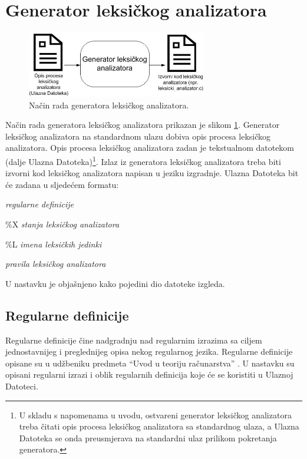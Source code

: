 \documentclass[times, 12pt, utf8]{book}
\begin{document}
\section{Generator leksičkog analizatora}

\begin{figure}[htb!]
\centering
\includegraphics[width=0.7\textwidth]{slike/generator-leksickog-analizatora.jpg}
\caption{Način rada generatora leksičkog analizatora.}
\label{fig:generator-leksickog-analizatora}
\end{figure}

Način rada generatora leksičkog analizatora prikazan je slikom \ref{fig:generator-leksickog-analizatora}.
Generator leksičkog analizatora na standardnom ulazu dobiva opis procesa leksičkog analizatora.
Opis procesa leksičkog analizatora zadan je tekstualnom datotekom (dalje Ulazna Datoteka)\footnote{U skladu s napomenama u uvodu, ostvareni generator leksičkog analizatora treba čitati opis procesa leksičkog analizatora sa standardnog ulaza, a Ulazna Datoteka se onda preusmjerava na standardni ulaz prilikom pokretanja generatora.}.
Izlaz iz generatora leksičkog analizatora treba biti izvorni kod leksičkog analizatora napisan u jeziku izgradnje.
Ulazna Datoteka bit će zadana u sljedećem formatu:
\begin{description}
\itemsep 1pt
\item \emph{regularne definicije}
\item \%X \emph{stanja leksičkog analizatora}
\item \%L \emph{imena leksičkih jedinki}
\item \emph{pravila leksičkog analizatora}
\end{description}
U nastavku je objašnjeno kako pojedini dio datoteke izgleda.

\subsection{Regularne definicije}
Regularne definicije čine nadgradnju nad regularnim izrazima sa ciljem jednostavnijeg i preglednijeg opisa nekog regularnog jezika.
Regularne definicije opisane su u udžbeniku predmeta “Uvod u teoriju računarstva” \cite[poglavlje 2.3.2]{utr}.
U nastavku su opisani regularni izrazi i oblik regularnih definicija koje će se koristiti u Ulaznoj Datoteci.
\end{document}
